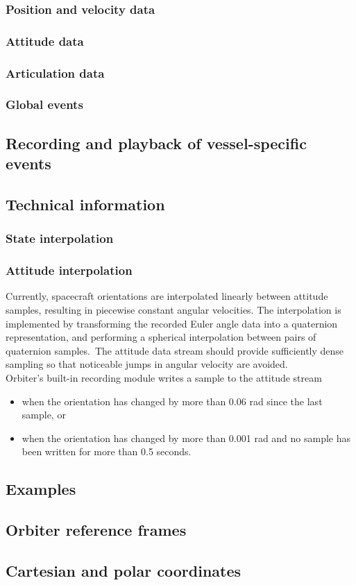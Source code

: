 \documentclass[Orbiter Technical Reference.tex]{subfiles}
\begin{document}
\subsubsection{Position and velocity data}
\subsubsection{Attitude data}
\subsubsection{Articulation data}
\subsubsection{Global events}
\subsection{Recording and playback of vessel-specific events}
\subsection{Technical information}
\subsubsection{State interpolation}
\subsubsection{Attitude interpolation}
Currently, spacecraft orientations are interpolated linearly between attitude samples, resulting in piecewise constant angular velocities. The interpolation is implemented by transforming the recorded Euler angle data into a quaternion representation, and performing a spherical interpolation between pairs of quaternion samples.\
The attitude data stream should provide sufficiently dense sampling so that noticeable jumps in angular velocity are avoided.\\
Orbiter’s built-in recording module writes a sample to the attitude stream

\begin{itemize}
\item when the orientation has changed by more than 0.06 rad since the last sample, or
\item when the orientation has changed by more than 0.001 rad and no sample has been written for more than 0.5 seconds.
\end{itemize}


\subsection{Examples}
\subsection{Orbiter reference frames}
\subsection{Cartesian and polar coordinates}
\end{document}
